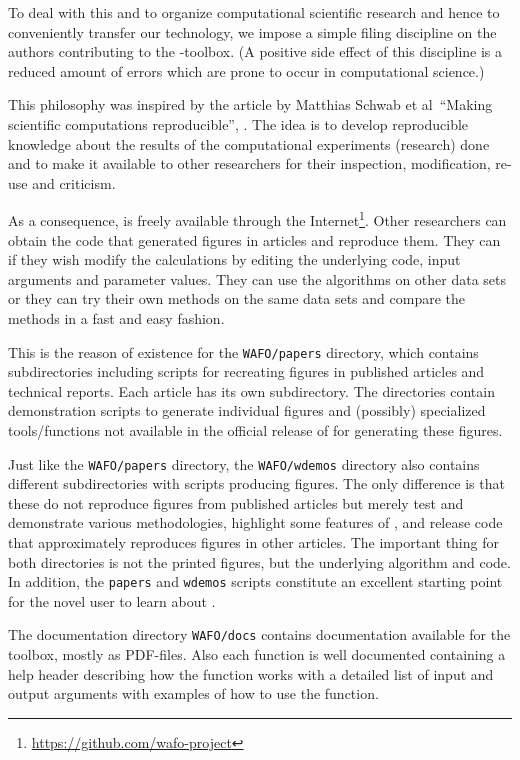 To deal with this and to organize computational scientific research and
hence to conveniently transfer our technology, we impose a simple filing
discipline on the authors contributing to the \progname{}-toolbox.
(A positive side effect of this discipline is a reduced amount of
errors which are prone to occur in computational science.)

This philosophy was inspired by the article by Matthias Schwab et
al~``Making scientific computations reproducible'', 
\cite{Schwab:2000:MSC:369545.369555}. 
The idea is to develop reproducible knowledge about the results of the
computational experiments (research) done and to
make it available to other researchers for their inspection,
modification, re-use and criticism.

As a consequence, \progname{} is freely available through the
Internet\footnote{\url{https://github.com/wafo-project}}.  
Other
researchers can  obtain  the \ML{} code that generated figures in
articles and reproduce them.  They can if they wish modify the
calculations by editing the underlying code, input arguments and
parameter values.  They can use the algorithms on other data sets or
they can try their own methods on the same data sets and compare the
methods in a fast and easy fashion.

This is the reason of existence for the \verb+WAFO/papers+ directory,
which contains subdirectories including scripts for recreating figures
in published articles and technical reports.  Each article has its own
subdirectory.  The directories contain demonstration scripts to
generate individual figures and (possibly) specialized tools/functions
not available in the official release of \progname{} for generating these
figures.

Just like the \verb+WAFO/papers+ directory, the \verb+WAFO/wdemos+ directory
also contains different
subdirectories with scripts producing figures.  The only difference is that
these do not reproduce figures from published articles but merely test and
demonstrate various methodologies, highlight some features of \progname{},
and release code that approximately
reproduces figures in other articles.
The important thing for both directories is not the printed figures,
but the underlying algorithm and code.
In addition, the \verb+papers+ and \verb+wdemos+ scripts constitute
an excellent starting point for the novel user to learn about \progname{}.

The documentation directory \verb+WAFO/docs+ contains 
documentation available for the toolbox, mostly as PDF-files. 
Also each function is well documented containing a help header
 describing how the function works with a detailed list of
input and output arguments with examples of how to use the function.

